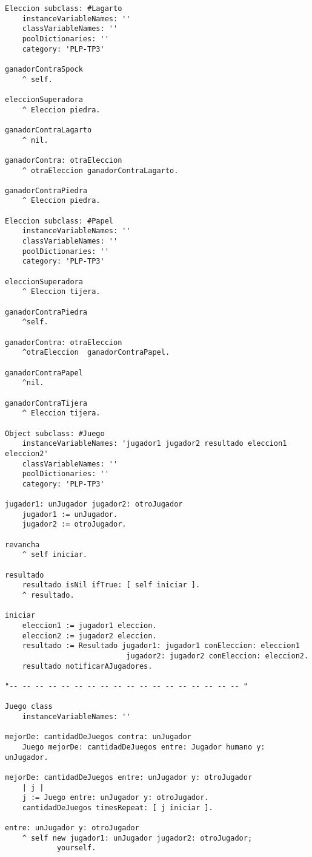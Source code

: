 \documentclass[10pt, a4paper,english,spanish,hidelinks]{article}
\begin{document}
\begin{verbatim}
Eleccion subclass: #Lagarto
	instanceVariableNames: ''
	classVariableNames: ''
	poolDictionaries: ''
	category: 'PLP-TP3'

ganadorContraSpock
	^ self. 

eleccionSuperadora
	^ Eleccion piedra. 

ganadorContraLagarto
	^ nil. 

ganadorContra: otraEleccion 
	^ otraEleccion ganadorContraLagarto. 

ganadorContraPiedra
	^ Eleccion piedra. 

Eleccion subclass: #Papel
	instanceVariableNames: ''
	classVariableNames: ''
	poolDictionaries: ''
	category: 'PLP-TP3'

eleccionSuperadora
	^ Eleccion tijera. 

ganadorContraPiedra
	^self. 

ganadorContra: otraEleccion
	^otraEleccion  ganadorContraPapel.  

ganadorContraPapel
	^nil. 

ganadorContraTijera
	^ Eleccion tijera. 

Object subclass: #Juego
	instanceVariableNames: 'jugador1 jugador2 resultado eleccion1 eleccion2'
	classVariableNames: ''
	poolDictionaries: ''
	category: 'PLP-TP3'

jugador1: unJugador jugador2: otroJugador 
	jugador1 := unJugador.
	jugador2 := otroJugador. 

revancha
	^ self iniciar. 

resultado	
	resultado isNil ifTrue: [ self iniciar ].	
	^ resultado. 

iniciar
	eleccion1 := jugador1 eleccion.
	eleccion2 := jugador2 eleccion.
	resultado := Resultado jugador1: jugador1 conEleccion: eleccion1
				 			jugador2: jugador2 conEleccion: eleccion2.
	resultado notificarAJugadores. 

"-- -- -- -- -- -- -- -- -- -- -- -- -- -- -- -- -- -- "

Juego class
	instanceVariableNames: ''

mejorDe: cantidadDeJuegos contra: unJugador
	Juego mejorDe: cantidadDeJuegos entre: Jugador humano y: unJugador. 

mejorDe: cantidadDeJuegos entre: unJugador y: otroJugador
	| j |
	j := Juego entre: unJugador y: otroJugador.
	cantidadDeJuegos timesRepeat: [ j iniciar ]. 

entre: unJugador y: otroJugador 
	^ self new jugador1: unJugador jugador2: otroJugador;
			yourself. 
\end{verbatim}
\end{document}

